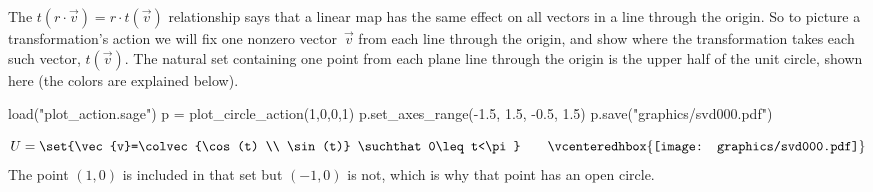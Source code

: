The $t(r\cdot\vec{v})=r\cdot t(\vec{v})$ relationship says that
a linear map has the same effect on all vectors in a line through the
origin.
So to picture a transformation's action we will fix 
one nonzero vector~$\vec{v}$ from each line through the origin,
and show where the transformation takes each such 
vector, $t(\vec{v})$.
The natural set containing one point from each plane line through the origin 
is the upper half of the unit circle, shown here
(the colors are explained below).
\begin{sagesilent}
load("plot_action.sage")
p = plot_circle_action(1,0,0,1) 
p.set_axes_range(-1.5, 1.5, -0.5, 1.5) 
p.save("graphics/svd000.pdf")
\end{sagesilent}
\begin{equation*}
  U=\set{\vec{v}=\colvec{\cos(t) \\ \sin(t)}
         \suchthat 
         0\leq t<\pi}
  \qquad
  \vcenteredhbox{\texttt{[image: graphics/svd000.pdf]}}  
\end{equation*}
The point $(1,0)$ is included in that set but
$(-1,0)$ is not, which is why that point has an open circle.

